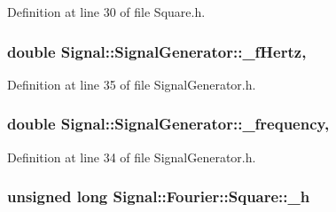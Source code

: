 Definition at line 30 of file Square.\+h.

\hypertarget{classSignal_1_1SignalGenerator_a85a4702347352bab1c71e0a8df8437d6}{
\subsubsection[{\+\_\+f\+Hertz}]{\setlength{\rightskip}{0pt plus 5cm}double Signal\+::\+Signal\+Generator\+::\+\_\+f\+Hertz\hspace{0.3cm}{\ttfamily [protected]}, {\ttfamily [inherited]}}}\label{classSignal_1_1SignalGenerator_a85a4702347352bab1c71e0a8df8437d6}


Definition at line 35 of file Signal\+Generator.\+h.

\hypertarget{classSignal_1_1SignalGenerator_a7f107461333bce68c5dad412db96a8c2}{
\subsubsection[{\+\_\+frequency}]{\setlength{\rightskip}{0pt plus 5cm}double Signal\+::\+Signal\+Generator\+::\+\_\+frequency\hspace{0.3cm}{\ttfamily [protected]}, {\ttfamily [inherited]}}}\label{classSignal_1_1SignalGenerator_a7f107461333bce68c5dad412db96a8c2}


Definition at line 34 of file Signal\+Generator.\+h.

\hypertarget{classSignal_1_1Fourier_1_1Square_a289e48f696976033845c704970e4de80}{
\subsubsection[{\+\_\+h}]{\setlength{\rightskip}{0pt plus 5cm}unsigned long Signal\+::\+Fourier\+::\+Square\+::\+\_\+h\hspace{0.3cm}{\ttfamily [protected]}}}\label{classSignal_1_1Fourier_1_1Square_a289e48f696976033845c704970e4de80}


